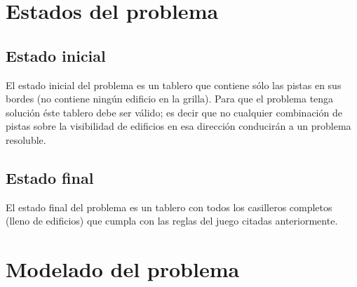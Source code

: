 \documentclass[%
    final,
    reprint,
    notitlepage,
    narroweqnarray,
    inline,
    twoside,
    invited
    ]{ieee}
\begin{document}


\section{Estados del problema}

\subsection{Estado inicial}

\par El estado inicial del problema es un tablero que contiene sólo las pistas en sus bordes (no contiene ningún edificio en la grilla). 
Para que el problema tenga solución éste tablero debe ser válido; es decir que no cualquier combinación de pistas sobre la visibilidad
 de edificios en esa dirección conducirán a un problema resoluble.

\subsection{Estado final}

\par El estado final del problema es un tablero con todos los casilleros completos (lleno de edificios) que cumpla con las reglas 
del juego citadas anteriormente.

\section{Modelado del problema}
\end{document}
